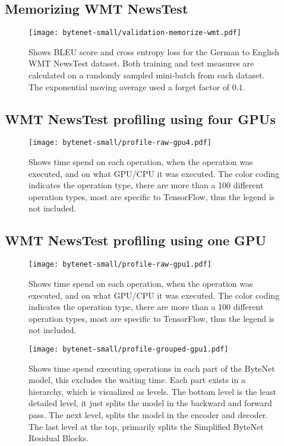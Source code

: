 \subsection{Memorizing WMT NewsTest}
\begin{figure}[h]
    \centering
    \texttt{[image: bytenet-small/validation-memorize-wmt.pdf]}
    \caption{Shows BLEU score and cross entropy loss for the German to English WMT NewsTest dataset. Both training and test measures are calculated on a randomly sampled mini-batch from each dataset. The exponential moving average used a forget factor of $0.1$.}
\end{figure}
\clearpage

\subsection{WMT NewsTest profiling using four GPUs}
\begin{figure}[h]
    \centering
    \texttt{[image: bytenet-small/profile-raw-gpu4.pdf]}
    \caption{Shows time spend on each operation, when the operation was executed, and on what GPU/CPU it was executed. The color coding indicates the operation type, there are more than a 100 different operation types, most are specific to TensorFlow, thus the legend is not included.}
\end{figure}
\clearpage


\subsection{WMT NewsTest profiling using one GPU}
\begin{figure}[h]
    \centering
    \texttt{[image: bytenet-small/profile-raw-gpu1.pdf]}
    \caption{Shows time spend on each operation, when the operation was executed, and on what GPU/CPU it was executed. The color coding indicates the operation type, there are more than a 100 different operation types, most are specific to TensorFlow, thus the legend is not included.}
\end{figure}

\begin{figure}[h]
    \centering
    \texttt{[image: bytenet-small/profile-grouped-gpu1.pdf]}
    \caption{Shows time spend executing operations in each part of the ByteNet model, this excludes the waiting time. Each part exists in a hierarchy, which is visualized as levels. The bottom level is the least detailed level, it just splits the model in the backward and forward pass. The next level, splits the model in the encoder and decoder. The last level at the top, primarily splits the Simplified ByteNet Residual Blocks.}
\end{figure}
